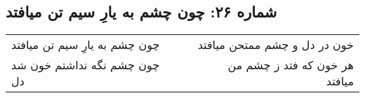 \begin{center}
\section*{شماره ۲۶: چون چشم به یارِ سیم تن میافتد}
\label{sec:026}
\begin{longtable}{l p{0.5cm} r}
چون چشم به یارِ سیم تن میافتد
&&
خون در دل و چشم ممتحن میافتد
\\
چون چشم نگه نداشتم خون شد دل
&&
هر خون که فتد ز چشم من میافتد
\\
\end{longtable}
\end{center}
